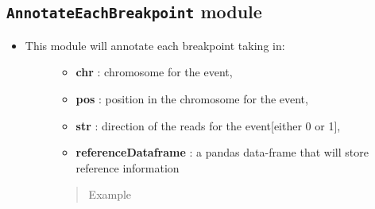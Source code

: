 \documentclass[letterpaper,10pt,english]{sphinxmanual}
\begin{document}
\subsection{\texttt{AnnotateEachBreakpoint} module}
\label{iAnnotateSV:annotateeachbreakpoint-module}\begin{itemize}
\item {} \begin{description}
\item[{This module will annotate each breakpoint taking in:}] \leavevmode\begin{itemize}
\item {} 
\textbf{chr} : chromosome for the event,

\item {} 
\textbf{pos} : position in the chromosome for the event,

\item {} 
\textbf{str} : direction of the reads for the event{[}either 0 or 1{]},

\item {} 
\textbf{referenceDataframe} : a pandas data-frame that will store reference information

\end{itemize}
\begin{quote}\begin{description}
\item[{Example}] \leavevmode
{}

\end{description}\end{quote}

\end{description}

\end{itemize}
\end{document}
